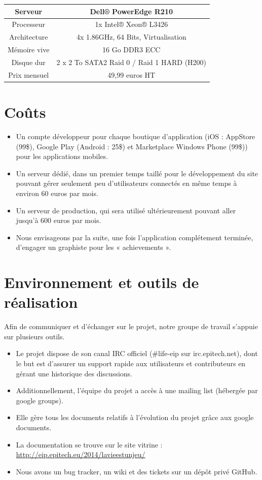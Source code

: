 \documentclass{life-fr}
\begin{document}
\vspace{20pt}

\begin{tabular}{|c|c|}
  \hline
   Serveur & Dell® PowerEdge R210\\
  \hline
  Processeur & 1x Intel® Xeon® L3426\\
  \hline
  Architecture & 4x 1.86GHz, 64 Bits, Virtualisation\\
  \hline
  Mémoire vive & 16 Go DDR3 ECC\\
  \hline
  Disque dur & 2 x 2 To SATA2 Raid 0 / Raid 1 HARD (H200)\\
  \hline
  Prix mensuel & 49,99 euros HT\\
  \hline
\end{tabular}

\vspace{20pt}

\section{Coûts}

\begin{itemize}
  \item Un compte développeur pour chaque boutique d'application (iOS : AppStore (99\$), Google Play (Android : 25\$) et Marketplace Windows Phone (99\$)) pour les applications mobiles.
  \item Un serveur dédié, dans un premier temps taillé pour le développement du site pouvant gérer seulement peu d'utilisateurs connectés en même temps à environ 60 euros par mois.
  \item Un serveur de production, qui sera utilisé ultérieurement pouvant aller jusqu'à 600 euros par mois.
  \item Nous envisageons par la suite, une fois l'application complétement terminée, d'engager un graphiste pour les « achievements ».
\end{itemize}

\section{Environnement et outils de réalisation}

Afin de communiquer et d’échanger sur le projet, notre groupe de travail s’appuie sur plusieurs outils.

\begin{itemize}
  \item Le projet dispose de son canal IRC officiel (\#life-eip sur irc.epitech.net), dont le but est d’assurer un support rapide aux utilisateurs et contributeurs en gérant une historique des discussions.
  \item Additionnellement, l’équipe du projet a accès à une mailing list (hébergée par google groups).
  \item Elle gère tous les documents relatifs à l’évolution du projet grâce aux google documents.
  \item La documentation se trouve sur le site vitrine : \url{http://eip.epitech.eu/2014/lavieestunjeu/}
  \item Nous avons un bug tracker, un wiki et des tickets sur un dépôt privé GitHub.
\end{itemize}
\end{document}

